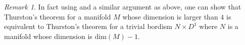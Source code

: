 \documentclass[a4paper]{amsart}
\theoremstyle{definition}
\theoremstyle{remark}
\newtheorem{rem}[thm]{Remark}
\numberwithin{equation}{section}
\begin{document}
\begin{rem}
In fact using  and a similar argument as above, one can show that Thurston's theorem for a manifold $M$ whose dimension is larger than $4$ is equivalent to Thurston's theorem for a trivial bordism $N\times D^1$ where $N$ is a manifold whose dimension is $\text{dim}(M)-1$.
\end{rem}
\end{document}
